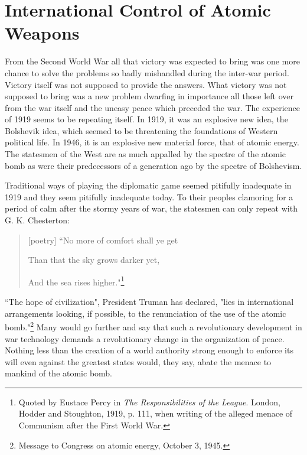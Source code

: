 
\chapter[International Control of Atomic Weapons]{International Control of Atomic Weapons}

\vspace{-2pt}


\vspace{39pt}

From the Second World War all that victory was expected to bring was one more chance to solve the problems so badly mishandled during the inter-war period. Victory itself was not supposed to provide the answers. What victory was not supposed to bring was a new problem dwarfing in importance all those left over from the war itself and the uneasy peace which preceded the war. The experience of 1919 seems to be repeating itself. In 1919, it was an explosive new idea, the Bolshevik idea, which seemed to be threatening the foundations of Western political life. In 1946, it is an explosive new material force, that of atomic energy. The statesmen of the West are as much appalled by the spectre of the atomic bomb as were their predecessors of a generation ago by the spectre of Bolshevism.

Traditional ways of playing the diplomatic game seemed pitifully inadequate in 1919 and they seem pitifully inadequate today. To their peoples clamoring for a period of calm after the stormy years of war, the statesmen can only repeat with G. K. Chesterton:

\begin{quote}[poetry]
``No more of comfort shall ye get

Than that the sky grows darker yet,

And the sea rises higher."\footnote{Quoted by Eustace Percy in \textit{The Responsibilities of the League}. London, Hodder and Stoughton, 1919, p. 111, when writing of the alleged menace of Communism after the First World War.}
\end{quote}

``The hope of civilization", President Truman has declared, "lies in international arrangements looking, if possible, to the renunciation of the use of the atomic bomb."\footnote{Message to Congress on atomic energy, October 3, 1945.} Many would go further and say that such a revolutionary development in war technology demands a revolutionary change in the organization of peace. Nothing less than the creation of a world authority strong enough to enforce its will even against the greatest states would, they say, abate the menace to mankind of the atomic bomb.

